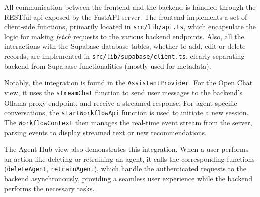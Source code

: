 All communication between the frontend and the backend is handled through the RESTful \acs{api} exposed by the FastAPI server. The frontend implements a set of client-side functions, primarily located in \texttt{src/lib/api.ts}, which encapsulate the logic for making \textit{fetch} requests to the various backend endpoints. Also, all the interactions with the Supabase database tables, whether to add, edit or delete records, are implemented in \texttt{src/lib/supabase/client.ts}, clearly separating backend from Supabase functionalities (mostly used for metadata).

Notably, the integration is found in the \texttt{AssistantProvider}. For the Open Chat view, it uses the \texttt{streamChat} function to send user messages to the backend's Ollama proxy endpoint, and receive a streamed response. For agent-specific conversations, the \texttt{startWorkflowApi} function is used to initiate a new session. The \texttt{WorkflowContext} then manages the real-time event stream from the server, parsing events to display streamed text or new recommendations.

The Agent Hub view also demonstrates this integration. When a user performs an action like deleting or retraining an agent, it calls the corresponding functions (\texttt{deleteAgent}, \texttt{retrainAgent}), which handle the authenticated requests to the backend asynchronously, providing a seamless user experience while the backend performs the necessary tasks.